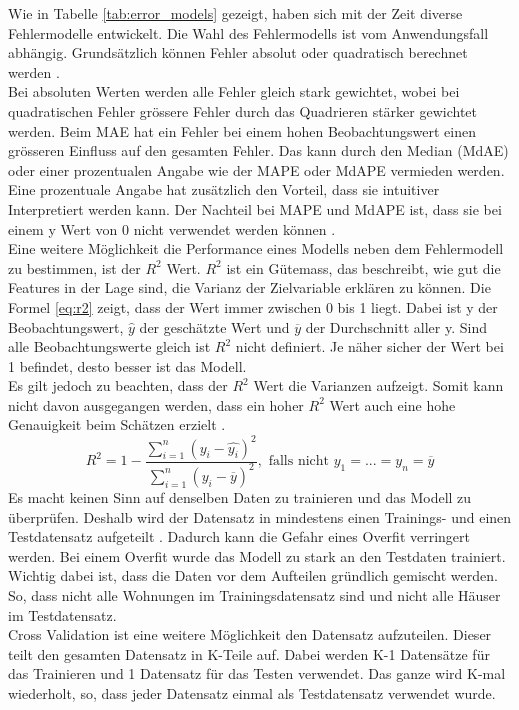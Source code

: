 %
Wie in Tabelle \ref{tab:error_models} gezeigt, haben sich mit der Zeit diverse Fehlermodelle entwickelt. Die Wahl des Fehlermodells ist vom Anwendungsfall abhängig. Grundsätzlich können Fehler absolut oder quadratisch berechnet werden \cite{error_models}.\\
Bei absoluten Werten werden alle Fehler gleich stark gewichtet, wobei bei quadratischen Fehler grössere Fehler durch das Quadrieren stärker gewichtet werden. Beim MAE hat ein Fehler bei einem hohen Beobachtungswert einen grösseren Einfluss auf den gesamten Fehler. Das kann durch den Median (MdAE) oder einer prozentualen Angabe wie der MAPE oder MdAPE vermieden werden. Eine prozentuale Angabe hat zusätzlich den Vorteil, dass sie intuitiver Interpretiert werden kann. Der Nachteil bei MAPE und MdAPE ist, dass sie bei einem y Wert von 0 nicht verwendet werden können \cite{error_models_2}.\\[2ex]
%
Eine weitere Möglichkeit die Performance eines Modells neben dem Fehlermodell zu bestimmen, ist der $R^2$ Wert. $R^2$ ist ein Gütemass, das beschreibt, wie gut die Features in der Lage sind, die Varianz der Zielvariable erklären zu können. Die Formel \eqref{eq:r2} zeigt, dass der Wert immer zwischen 0 bis 1 liegt. Dabei ist y der Beobachtungswert, $\hat{y}$ der geschätzte Wert und $\overline{y}$ der Durchschnitt aller y. Sind alle Beobachtungswerte gleich ist $R^2$ nicht definiert. Je näher sicher der Wert bei 1 befindet, desto besser ist das Modell.\\
Es gilt jedoch zu beachten, dass der $R^2$ Wert die Varianzen aufzeigt. Somit kann nicht davon ausgegangen werden, dass ein hoher $R^2$ Wert auch eine hohe Genauigkeit beim Schätzen erzielt \cite{r2, r2_2}. 
\begin{equation}
\label{eq:r2}
R^2 = 1 - \frac{\sum_{i=1}^{n} (y_i - \hat{y_i})^2}{\sum_{i=1}^{n}(y_i - \overline{y})^2},\text{ falls nicht }y_1  = ... = y_n = \overline{y}
\end{equation}
%
Es macht keinen Sinn auf denselben Daten zu trainieren und das Modell zu überprüfen. Deshalb wird der Datensatz in mindestens einen Trainings- und einen Testdatensatz aufgeteilt \cite{cross_validation}.
Dadurch kann die Gefahr eines Overfit verringert werden. Bei einem Overfit wurde das Modell zu stark an den Testdaten trainiert. Wichtig dabei ist, dass die Daten vor dem Aufteilen gründlich gemischt werden. So, dass nicht alle Wohnungen im Trainingsdatensatz sind und nicht alle Häuser im Testdatensatz.\\
Cross Validation ist eine weitere Möglichkeit den Datensatz aufzuteilen. Dieser teilt den gesamten Datensatz in K-Teile auf. Dabei werden K-1 Datensätze für das Trainieren und 1 Datensatz für das Testen verwendet. Das ganze wird K-mal wiederholt, so, dass jeder Datensatz einmal als Testdatensatz verwendet wurde.
%
